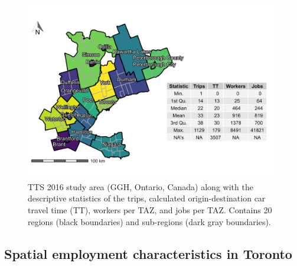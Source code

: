 \documentclass[]{elsarticle} %
\begin{document}
\begin{figure}

{\centering \includegraphics[width=1\linewidth]{images/TTS16-survey-area} 

}

\caption{\label{fig:TTS-16-survey-area}TTS 2016 study area (GGH, Ontario, Canada) along with the descriptive statistics of the trips, calculated origin-destination car travel time (TT), workers per TAZ, and jobs per TAZ. Contains 20 regions (black boundaries) and sub-regions (dark gray boundaries).}\label{fig:TTS-16-survey-area}
\end{figure}

\hypertarget{spatial-employment-characteristics-in-toronto}{%
\subsection{Spatial employment characteristics in
Toronto}\label{spatial-employment-characteristics-in-toronto}}
\end{document}
